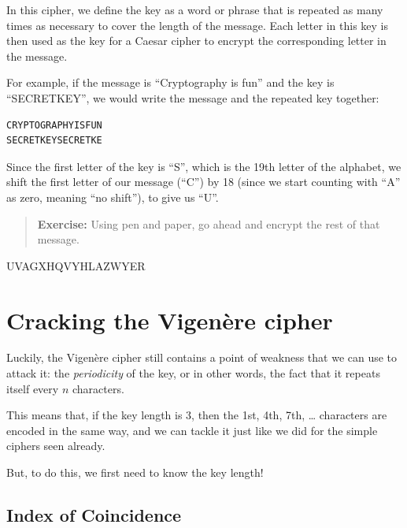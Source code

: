 \documentclass[
  letterpaper,
  DIV=11,
  numbers=noendperiod]{scrreprt}
\begin{document}
In this cipher, we define the key as a word or phrase that is repeated
as many times as necessary to cover the length of the message. Each
letter in this key is then used as the key for a Caesar cipher to
encrypt the corresponding letter in the message.

For example, if the message is ``Cryptography is fun'' and the key is
``SECRETKEY'', we would write the message and the repeated key together:

\begin{verbatim}
CRYPTOGRAPHYISFUN
SECRETKEYSECRETKE
\end{verbatim}

Since the first letter of the key is ``S'', which is the 19th letter of
the alphabet, we shift the first letter of our message (``C'') by 18
(since we start counting with ``A'' as zero, meaning ``no shift''), to
give us ``U''.

\begin{quote}
\textbf{Exercise:} Using pen and paper, go ahead and encrypt the rest of
that message.
\end{quote}

\hypertarget{vig-encrypt}{}
\leavevmode{}%

\leavevmode{}%
UVAGXHQVYHLAZWYER

\hypertarget{cracking-the-vigenuxe8re-cipher}{%
\section{Cracking the Vigenère
cipher}\label{cracking-the-vigenuxe8re-cipher}}

Luckily, the Vigenère cipher still contains a point of weakness that we
can use to attack it: the \emph{periodicity} of the key, or in other
words, the fact that it repeats itself every \(n\) characters.

This means that, if the key length is 3, then the 1st, 4th, 7th,
\ldots{} characters are encoded in the same way, and we can tackle it
just like we did for the simple ciphers seen already.

But, to do this, we first need to know the key length!

\hypertarget{index-of-coincidence}{%
\subsection{Index of Coincidence}\label{index-of-coincidence}}
\end{document}
